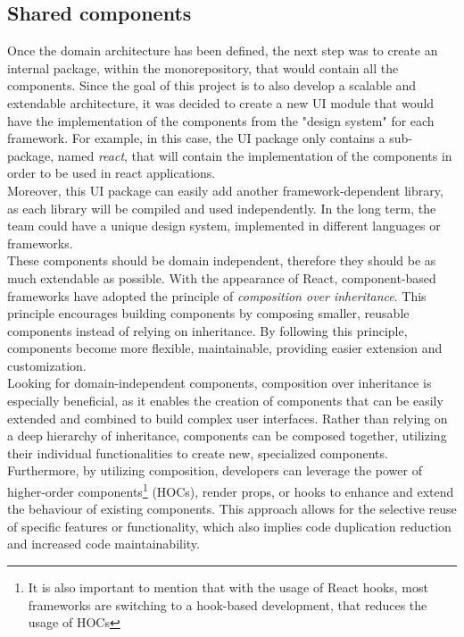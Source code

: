 \documentclass[../design.tex]{subfiles}
\begin{document}
\subsection{Shared components}
Once the domain architecture has been defined, the next step was to create an
internal package, within the monorepository, that would contain all the
components. Since the goal of this project is to also develop a scalable and
extendable architecture, it was decided to create a new UI module that would
have the implementation of the components from the "design system" for each
framework. For example, in this case, the UI package only contains a
sub-package, named \emph{react}, that will contain the implementation of the
components in order to be used in react applications.
\\
Moreover, this UI package can easily add another framework-dependent library, as
each library will be compiled and used independently. In the long term, the team
could have a unique design system, implemented in different languages or
frameworks.
\\[8pt]
These components should be domain independent, therefore they should be as much
extendable as possible. With the appearance of React, component-based frameworks
have adopted the principle of \emph{composition over inheritance}. This
principle encourages building components by composing smaller, reusable
components instead of relying on inheritance. By following this principle,
components become more flexible, maintainable, providing easier extension and
customization.
\\
Looking for domain-independent components, composition over inheritance is
especially beneficial, as it enables the creation of components that can be
easily extended and combined to build complex user interfaces. Rather than
relying on a deep hierarchy of inheritance, components can be composed together,
utilizing their individual functionalities to create new, specialized
components.
\\
Furthermore, by utilizing composition, developers can leverage the power of
higher-order components\footnote{It is also important to mention that with the
	usage of React hooks, most frameworks are switching to a hook-based development,
	that reduces the usage of HOCs} (HOCs), render props, or hooks to enhance and
extend the behaviour of existing components. This approach allows for the
selective reuse of specific features or functionality, which also implies code
duplication reduction and increased code maintainability.
\\
\end{document}

